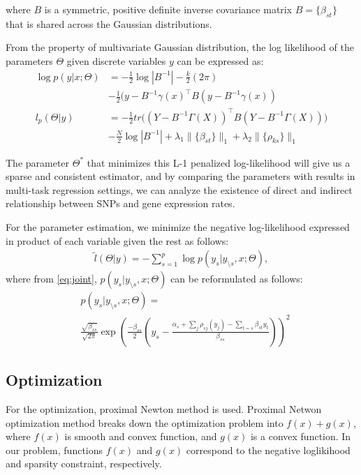 \documentclass{article}
\begin{document}
where $B$ is a symmetric, positive definite inverse covariance matrix $B = \{ \beta_{st}\}$ that is shared across the Gaussian distributions. 

From the property of multivariate Gaussian distribution, the log likelihood of the parameters $\Theta$ given discrete variables $y$ can be expressed as:
\begin{align}
\log p(y | x; \Theta) &= -\frac{1}{2}\log |B^{-1}| -\frac{k}{2} (2 \pi) \nonumber    \\
& -\frac{1}{2} (y - B^{-1} \gamma(x)^\intercal B (y - B^{-1} \gamma(x)) \label{eq:loglikli} \\ 
l_p(\Theta|y) &= -\frac{1}{2} tr\Big((Y - B^{-1} \Gamma(X))^\intercal B (Y - B^{-1} \Gamma(X)) \Big) \nonumber \\
& -\frac{N}{2} \log|B^{-1}| + \lambda_1 \|\{\beta_{st}\}\|_1 + \lambda_2 \|\{\rho_{ks}\}\|_1 \label{eq:obj}
\end{align}

The parameter $\Theta^*$ that minimizes this L-1 penalized log-likelihood will give us a sparse and consistent estimator, and by comparing the parameters with results in multi-task regression settings, we can analyze the existence of direct and indirect relationship between SNPs and gene expression rates.

For the parameter estimation, we minimize the negative log-likelihood expressed in product of each variable given the rest as follows:
\begin{align}
\tilde{l}(\Theta |y) = - \sum_{s=1}^{p} \log p(y_s |y_{\setminus s}, x;\Theta),
\end{align}
where from \ref{eq:joint}, $p(y_s |y_{\setminus s}, x;\Theta)$ can be reformulated as follows:
\begin{align}
&p(y_s |y_{\setminus s}, x;\Theta) =\nonumber    \\
& \frac{\sqrt{\beta_{ss}}}{\sqrt{2\pi}} \exp \left(\frac{-\beta_{ss}}{2} \left(y_s - \frac{\alpha_s + \sum_j \rho_{sj}(y_j)-\sum_{t=s}\beta_{st}y_t }{\beta_{ss}}\right) \right)^2
\end{align}




\subsection{Optimization}
For the optimization, proximal Newton method \cite{schmidt2010graphical,schmidt2011projected} is used. Proximal Netwon optimization method breaks down the optimization problem into $f(x) + g(x)$, where $f(x)$ is smooth and convex function, and $g(x)$ is a convex function. 
In our problem, functions $f(x)$ and $g(x)$ correspond to the negative loglikihood and sparsity constraint, respectively.
\end{document}
